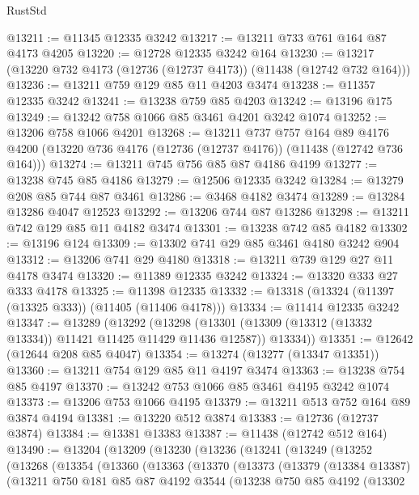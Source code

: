 \begin{lexlean}{RustStd}
\begin{coremodule}
@13211 := @11345 @12335 @3242
@13217 := @13211 @733 @761 @164 @87 @4173 @4205
@13220 := @12728 @12335 @3242 @164
@13230 := @13217 (@13220 @732 @4173 (@12736 (@12737 @4173)) (@11438 (@12742 @732 @164)))
@13236 := @13211 @759 @129 @85 @11 @4203 @3474
@13238 := @11357 @12335 @3242
@13241 := @13238 @759 @85 @4203
@13242 := @13196 @175
@13249 := @13242 @758 @1066 @85 @3461 @4201 @3242 @1074
@13252 := @13206 @758 @1066 @4201
@13268 := @13211
    @737
    @757
    @164
    @89
    @4176
    @4200
    (@13220 @736 @4176 (@12736 (@12737 @4176)) (@11438 (@12742 @736 @164)))
@13274 := @13211 @745 @756 @85 @87 @4186 @4199
@13277 := @13238 @745 @85 @4186
@13279 := @12506 @12335 @3242
@13284 := @13279 @208 @85 @744 @87 @3461
@13286 := @3468 @4182 @3474
@13289 := @13284 @13286 @4047 @12523
@13292 := @13206 @744 @87 @13286
@13298 := @13211 @742 @129 @85 @11 @4182 @3474
@13301 := @13238 @742 @85 @4182
@13302 := @13196 @124
@13309 := @13302 @741 @29 @85 @3461 @4180 @3242 @904
@13312 := @13206 @741 @29 @4180
@13318 := @13211 @739 @129 @27 @11 @4178 @3474
@13320 := @11389 @12335 @3242
@13324 := @13320 @333 @27 @333 @4178
@13325 := @11398 @12335
@13332 := @13318 (@13324 (@11397 (@13325 @333)) (@11405 (@11406 @4178)))
@13334 := @11414 @12335 @3242
@13347 := @13289
    (@13292
      (@13298 (@13301 (@13309 (@13312 (@13332 @13334)) @11421 @11425 @11429 @11436 @12587)) @13334))
@13351 := @12642 (@12644 @208 @85 @4047)
@13354 := @13274 (@13277 (@13347 @13351))
@13360 := @13211 @754 @129 @85 @11 @4197 @3474
@13363 := @13238 @754 @85 @4197
@13370 := @13242 @753 @1066 @85 @3461 @4195 @3242 @1074
@13373 := @13206 @753 @1066 @4195
@13379 := @13211 @513 @752 @164 @89 @3874 @4194
@13381 := @13220 @512 @3874
@13383 := @12736 (@12737 @3874)
@13384 := @13381 @13383
@13387 := @11438 (@12742 @512 @164)
@13490 := @13204
    (@13209
      (@13230
        (@13236
          (@13241
            (@13249
              (@13252
                (@13268
                  (@13354
                    (@13360
                      (@13363
                        (@13370
                          (@13373
                            (@13379
                              (@13384 @13387)
                              (@13211
                                @750
                                @181
                                @85
                                @87
                                @4192
                                @3544
                                (@13238
                                  @750
                                  @85
                                  @4192
                                  (@13302

\end{coremodule}
\end{lexlean}
